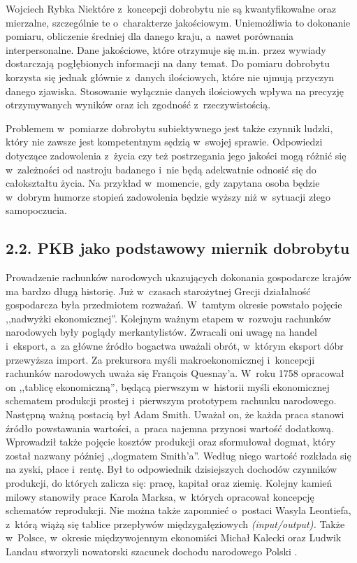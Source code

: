 \begin{artplenv}{Wojciech Rybka}
Niektóre z~koncepcji dobrobytu nie są kwantyfikowalne oraz mierzalne, szczególnie te o~charakterze jakościowym.
Uniemożliwia to dokonanie pomiaru, obliczenie średniej dla danego kraju, a~nawet porównania interpersonalne. Dane
jakościowe, które otrzymuje się m.in. przez wywiady dostarczają pogłębionych informacji na dany temat. Do pomiaru
dobrobytu korzysta się jednak głównie z~danych ilościowych, które nie ujmują przyczyn danego zjawiska. Stosowanie
wyłącznie danych ilościowych wpływa na precyzję otrzymywanych wyników oraz ich zgodność z~rzeczywistością.

Problemem w~pomiarze dobrobytu subiektywnego jest także czynnik ludzki, który nie zawsze jest kompetentnym
sędzią w~swojej sprawie. Odpowiedzi dotyczące zadowolenia z~życia czy też postrzegania
jego jakości mogą różnić się w~zależności
od nastroju badanego i~nie będą adekwatnie odnosić się do całokształtu życia. Na przykład w~momencie, gdy zapytana
osoba będzie w~dobrym humorze stopień zadowolenia będzie wyższy niż w~sytuacji złego samopoczucia. 

\subsection{2.2. PKB jako podstawowy miernik dobrobytu}
Prowadzenie rachunków narodowych ukazujących dokonania gospodarcze krajów ma bardzo długą historię. Już w~czasach
starożytnej Grecji działalność gospodarcza była przedmiotem rozważań. W~tamtym okresie powstało pojęcie ,,nadwyżki
ekonomicznej''. Kolejnym ważnym etapem w~rozwoju rachunków narodowych były poglądy merkantylistów. Zwracali oni uwagę na
handel i~eksport, a~za główne źródło bogactwa uważali obrót, w~którym eksport dóbr przewyższa import. Za prekursora
myśli makroekonomicznej i~koncepcji rachunków narodowych uważa się François Quesnay’a. W~roku 1758 opracował on
,,tablicę ekonomiczną'', będącą pierwszym w~historii myśli ekonomicznej schematem produkcji prostej i~pierwszym
prototypem rachunku narodowego. Następną ważną postacią był Adam Smith. Uważał on, że każda praca stanowi źródło
powstawania wartości, a~praca najemna przynosi wartość dodatkową. Wprowadził także pojęcie kosztów produkcji oraz
sformułował dogmat, który został nazwany później ,,dogmatem Smith’a''. Według niego wartość rozkłada się na zyski, płace
i~rentę. Był to odpowiednik dzisiejszych dochodów czynników produkcji, do których zalicza się: pracę, kapitał oraz
ziemię. Kolejny kamień milowy stanowiły prace Karola Marksa, w~których opracował koncepcję schematów reprodukcji. Nie
można także zapomnieć o~postaci Wasyla Leontiefa, z~którą wiążą się tablice przepływów międzygałęziowych
\textit{(input/output). }Także w~Polsce, w~okresie międzywojennym ekonomiści Michał Kalecki oraz Ludwik Landau
stworzyli nowatorski szacunek dochodu narodowego Polski
\parencite{zienkowski_co_2001}.


\end{artplenv}
